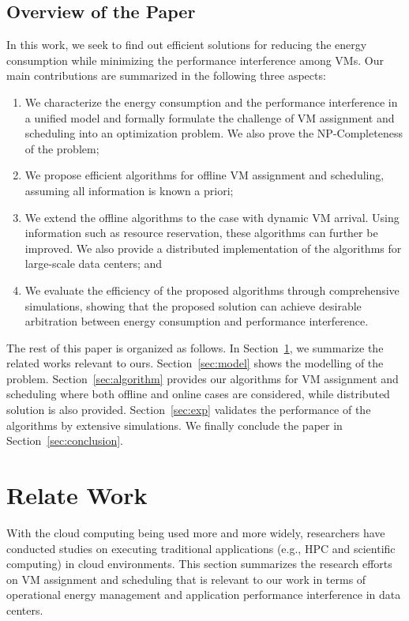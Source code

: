 \documentclass[10pt,journal]{IEEEtran}
\begin{document}
\subsection{Overview of the Paper}

In this work, we seek to find out efficient solutions for reducing the energy consumption while minimizing the performance interference among VMs. Our main contributions are summarized in the following three aspects:
\begin{enumerate}
\item We characterize the energy consumption and the performance interference in a unified model and  formally formulate the challenge of VM assignment and scheduling into an optimization problem. We also prove the NP-Completeness of the problem;
\item We propose efficient algorithms for offline VM assignment and scheduling, assuming all information is known a priori;
\item We extend the offline algorithms to the case with dynamic VM arrival. Using information such as resource reservation, these algorithms can further be improved. We also provide a distributed implementation of the algorithms for large-scale data centers; and
\item We evaluate the efficiency of the proposed algorithms through comprehensive simulations, showing that the proposed solution can achieve desirable arbitration between energy consumption and performance interference.
\end{enumerate}

The rest of this paper is organized as follows. In Section~\ref{sec:related}, we summarize the related works relevant to ours. Section~\ref{sec:model} shows the modelling of the problem. Section~\ref{sec:algorithm} provides our algorithms for VM assignment and scheduling where both offline and online cases are considered, while distributed solution is also provided. Section~\ref{sec:exp} validates the performance of the algorithms by extensive simulations. We finally conclude the paper in Section~\ref{sec:conclusion}.



\section{Relate Work}
\label{sec:related}

With the cloud computing being used more and more widely, researchers have conducted studies on executing traditional applications (e.g., HPC and scientific computing) in cloud environments. This section summarizes the research efforts on VM assignment and scheduling that is relevant to our work in terms of operational energy management and application performance interference in data centers.
\end{document}

